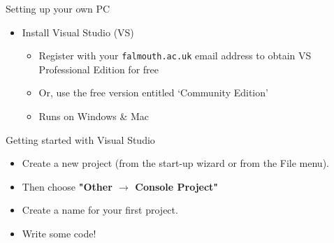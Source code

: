 \begin{frame}{Setting up your own PC}
\begin{itemize}
\item Install Visual Studio (VS)
\begin{itemize}
	\item Register with your \texttt{falmouth.ac.uk} email address to obtain VS Professional Edition for free
	\item Or, use the free version entitled `Community Edition'
	\item Runs on Windows \& Mac
\end{itemize}
\end{itemize}
\end{frame}

\begin{frame}{Getting started with Visual Studio}
\begin{itemize}
\item Create a new project (from the start-up wizard or from the File menu).
\item Then choose \textbf{"Other $\to$ Console Project"}
\item Create a name for your first project.
\item Write some code!
\end{itemize}
\end{frame}
